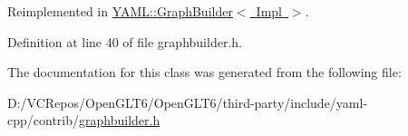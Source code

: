 Reimplemented in \mbox{\hyperlink{class_y_a_m_l_1_1_graph_builder_ae94e00378956c3d1dec2cce5cdbd70fc}{Y\+A\+M\+L\+::\+Graph\+Builder$<$ Impl $>$}}.



Definition at line 40 of file graphbuilder.\+h.



The documentation for this class was generated from the following file\+:\begin{DoxyCompactItemize}
\item 
D\+:/\+V\+C\+Repos/\+Open\+G\+L\+T6/\+Open\+G\+L\+T6/third-\/party/include/yaml-\/cpp/contrib/\mbox{\hyperlink{graphbuilder_8h}{graphbuilder.\+h}}\end{DoxyCompactItemize}
